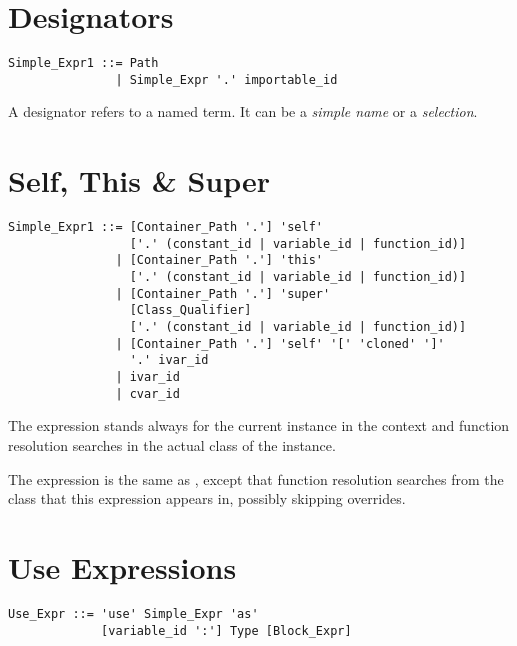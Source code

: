 \section{Designators}

\syntax\begin{lstlisting}
Simple_Expr1 ::= Path
               | Simple_Expr '.' importable_id
\end{lstlisting}

A designator refers to a named term. It can be a {\em simple name} or a {\em selection}.






\section{Self, This \& Super}
\label{sec:self-this-super}

\syntax\begin{lstlisting}
Simple_Expr1 ::= [Container_Path '.'] 'self'
                 ['.' (constant_id | variable_id | function_id)]
               | [Container_Path '.'] 'this'
                 ['.' (constant_id | variable_id | function_id)]
               | [Container_Path '.'] 'super' 
                 [Class_Qualifier] 
                 ['.' (constant_id | variable_id | function_id)]
               | [Container_Path '.'] 'self' '[' 'cloned' ']'
                 '.' ivar_id
               | ivar_id
               | cvar_id
\end{lstlisting}

The expression  stands always for the current instance in the context and function resolution searches in the actual class of the instance. 

The expression  is the same as , except that function resolution searches from the class that this expression appears in, possibly skipping overrides. 







\section{Use Expressions}
\label{sec:use-expressions}

\syntax\begin{lstlisting}
Use_Expr ::= 'use' Simple_Expr 'as' 
             [variable_id ':'] Type [Block_Expr]
\end{lstlisting}

